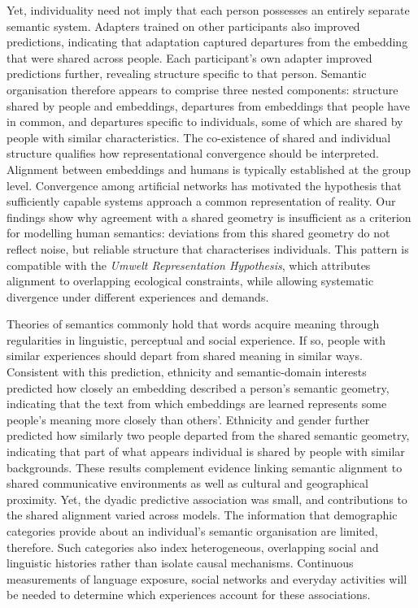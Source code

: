 \documentclass[pdflatex,sn-mathphys]{sn-jnl}
\begin{document}
Yet, individuality need not imply that each person possesses an entirely separate semantic system. Adapters trained on other participants also improved predictions, indicating that adaptation captured departures from the embedding that were shared across people. Each participant's own adapter improved predictions further, revealing structure specific to that person. Semantic organisation therefore appears to comprise three nested components: structure shared by people and embeddings, departures from embeddings that people have in common, and departures specific to individuals, some of which are shared by people with similar characteristics. The co-existence of shared and individual structure qualifies how representational convergence should be interpreted. Alignment between embeddings and humans is typically established at the group level\cite{Grand2022,Peterson2018,Hebart2020,Muttenthaler2022,Goldstein2024}. Convergence among artificial networks has motivated the hypothesis that sufficiently capable systems approach a common representation of reality\cite{Universal2025}. Our findings show why agreement with a shared geometry is insufficient as a criterion for modelling human semantics: deviations from this shared geometry do not reflect noise, but reliable structure that characterises individuals. This pattern is compatible with the \textit{Umwelt Representation Hypothesis}, which attributes alignment to overlapping ecological constraints, while allowing systematic divergence under different experiences and demands\cite{Bosch2026}.

Theories of semantics commonly hold that words acquire meaning through regularities in linguistic, perceptual and social experience\cite{Binder2011,Meteyard2012,Reilly2025}. If so, people with similar experiences should depart from shared meaning in similar ways. Consistent with this prediction, ethnicity and semantic-domain interests predicted how closely an embedding described a person's semantic geometry, indicating that the text from which embeddings are learned represents some people's meaning more closely than others'. Ethnicity and gender further predicted how similarly two people departed from the shared semantic geometry, indicating that part of what appears individual is shared by people with similar backgrounds. These results complement evidence linking semantic alignment to shared communicative environments as well as cultural and geographical proximity\cite{Schwartz2013,Marti2023}. Yet, the dyadic predictive association was small, and contributions to the shared alignment varied across models. The information that demographic categories provide about an individual's semantic organisation are limited, therefore. Such categories also index heterogeneous, overlapping social and linguistic histories rather than isolate causal mechanisms. Continuous measurements of language exposure, social networks and everyday activities will be needed to determine which experiences account for these associations.
\end{document}
